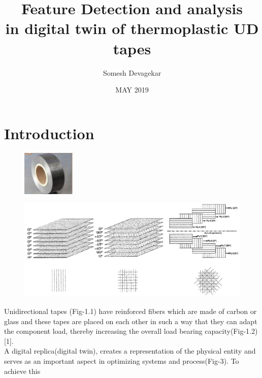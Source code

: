 \documentclass[rnd]{mas_proposal}
\title{Feature Detection and analysis\\in digital twin of thermoplastic UD tapes }
\author{Somesh Devagekar}
\date{MAY 2019}
\begin{document}
\newcommand{\SubItem}[1]{
    {\setlength\itemindent{15pt} \item[-] #1}
}

\maketitle

\pagestyle{plain}

\chapter{Introduction}
\begin{figure}
\centering
\begin{minipage}{.4\textwidth}
  \centering
  \includegraphics[width=0.4\linewidth]{tape.png}
  \label{fig:test1}
\end{minipage}%
\begin{minipage}{.5\textwidth}
  \centering
  \includegraphics[width=1\linewidth]{stacking.png}
  \label{fig:test2}
\end{minipage}
\end{figure}
    Unidirectional tapes (Fig-1.1) have reinforced fibers which are made of carbon or glass and these tapes are placed on each other in such a way that they can adapt the component load, thereby increasing the overall load bearing capacity(Fig-1.2)[1].\\
\indent    A digital replica(digital twin), creates a representation of the physical entity and serves as an important aspect in optimizing systems and process(Fig-3). To achieve this
\end{document}
